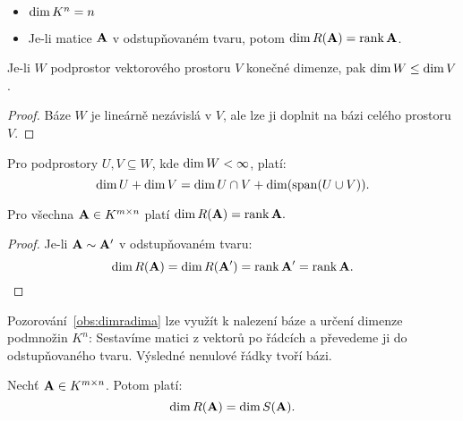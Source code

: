\begin{remark}
    \leavevmode
    \begin{itemize}
        \item $\mathop{\mathrm{dim}} K^n = n$
        \item Je-li matice $\mathbf{A}$ v odstupňovaném tvaru, potom 
            $\mathop{\mathrm{dim}} R(\mathbf{A}) = \mathop{\mathrm{rank}} \mathbf{A}$.
    \end{itemize}
\end{remark}

\begin{observation}
    Je-li $W$ podprostor vektorového prostoru $V$ konečné dimenze, pak
    $\mathop{\mathrm{dim}} W \leq \mathop{\mathrm{dim}} V$.
\end{observation}

\begin{proof}
    Báze $W$ je lineárně nezávislá v $V$, ale lze ji doplnit na bázi 
    celého prostoru $V$.
\end{proof}

\begin{observation}
    Pro podprostory $U, V \subseteq W$, kde $\mathop{\mathrm{dim}} W < \infty$, platí:
    $$\mathop{\mathrm{dim}} U + \mathop{\mathrm{dim}} V = \mathop{\mathrm{dim}} U \cap V + \mathop{\mathrm{dim}}(\mathop{\mathrm{span}}(U \cup V)).$$
\end{observation}

\begin{observation}
    \label{obs:dimradima}
    Pro všechna $\mathbf{A} \in K^{m \times n}$ platí $\mathop{\mathrm{dim}} R(\mathbf{A}) 
    = \mathop{\mathrm{rank}} \mathbf{A}.$
\end{observation}

\begin{proof}
    Je-li $\mathbf{A} \sim \mathbf{A'}$ v odstupňovaném tvaru: $$\mathop{\mathrm{dim}} R(\mathbf{A})
    = \mathop{\mathrm{dim}} R(\mathbf{A'})  = \mathop{\mathrm{rank}} \mathbf{A'} = \mathop{\mathrm{rank}} \mathbf{A}.$$
\end{proof}

\begin{remark}
    Pozorování~\ref{obs:dimradima} lze využít k nalezení báze a určení
    dimenze podmnožin $K^n$: Sestavíme matici z vektorů po řádcích a 
    převedeme ji do odstupňovaného tvaru. Výsledné nenulové řádky tvoří 
    bázi.
\end{remark}

\begin{theorem}
    \label{theorem:dimradimsa}
    Nechť $\mathbf{A} \in K^{m \times n}$. Potom platí:
    $$\mathop{\mathrm{dim}} R(\mathbf{A}) = \mathop{\mathrm{dim}} S(\mathbf{A}).$$
\end{theorem}

